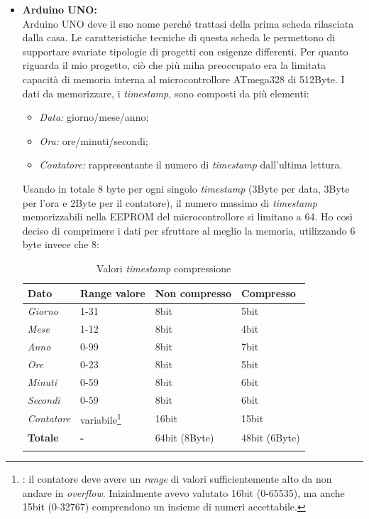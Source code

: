 \begin{itemize}



\item \textbf{Arduino UNO:}\\
Arduino UNO deve il suo nome perché trattasi della prima scheda rilasciata dalla casa. Le caratteristiche tecniche di questa scheda le permettono di supportare svariate tipologie di progetti con esigenze differenti. Per quanto riguarda il mio progetto, ciò che più miha  preoccupato era la limitata capacità di memoria interna al microcontrollore ATmega328 di 512Byte. I dati da memorizzare, i \textit{timestamp}, sono composti da più elementi:
\begin{itemize}
\item \textit{Data:} giorno/mese/anno;
\item \textit{Ora:} ore/minuti/secondi;
\item \textit{Contatore:} rappresentante il numero di \textit{timestamp} dall'ultima lettura.
\end{itemize}

Usando in totale 8 byte per ogni singolo \textit{timestamp} (3Byte per data, 3Byte per l'ora e 2Byte per il contatore), il numero massimo di \textit{timestamp} memorizzabili nella EEPROM del microcontrollore si limitano a 64. Ho così deciso di comprimere i dati per sfruttare al meglio la memoria, utilizzando 6 byte invece che 8:

\begin{longtable}{ p{} | p{} | p{} | p{}}
\textbf{Dato} & \textbf{Range valore} & \textbf{Non compresso} & \textbf{Compresso} \\
 \endhead
 \midrule
 \textit{Giorno} & 1-31 & 8bit & 5bit \\
 \midrule
 \textit{Mese} & 1-12 & 8bit & 4bit \\
 \midrule
 \textit{Anno} & 0-99 & 8bit & 7bit \\
 \midrule
 \textit{Ore} & 0-23 & 8bit & 5bit \\
 \midrule
 \textit{Minuti} & 0-59 & 8bit & 6bit \\
 \midrule
 \textit{Secondi} & 0-59 & 8bit & 6bit \\
 \midrule
 \textit{Contatore} & variabile\footnote{ : il contatore deve avere un \textit{range} di valori sufficientemente alto da non andare in \textit{overflow}. Inizialmente avevo valutato 16bit (0-65535), ma anche 15bit (0-32767) comprendono un insieme di numeri accettabile.} & 16bit & 15bit \\
 \midrule
 \textbf{Totale} & \textbf{-} & 64bit (8Byte) & 48bit (6Byte) \\
 \bottomrule
 \caption{Valori \textit{timestamp} compressione}
\end{longtable}


\end{itemize}
